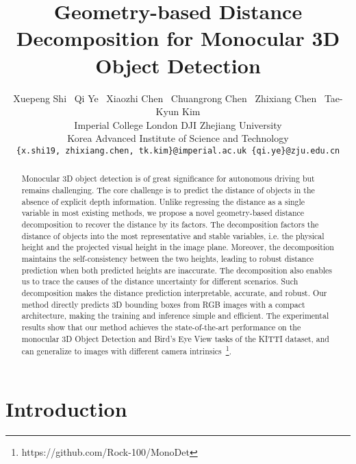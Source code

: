 \documentclass[10pt,twocolumn,letterpaper]{article}
\begin{document}
\title{Geometry-based Distance Decomposition for Monocular 3D Object Detection}

\author{
\parbox{16cm}{
\centering
{\large Xuepeng Shi \ Qi Ye \ Xiaozhi Chen \ Chuangrong Chen \ Zhixiang Chen \ Tae-Kyun Kim}\\
{\normalsize
 Imperial College London \quad  DJI \quad  Zhejiang University\\
 Korea Advanced Institute of Science and Technology\\
}
{\tt\small \{x.shi19, zhixiang.chen, tk.kim\}@imperial.ac.uk \quad \{qi.ye\}@zju.edu.cn}
}
}

\maketitle
\ificcvfinal\thispagestyle{empty}\fi


\begin{abstract}
Monocular 3D object detection is of great significance for autonomous driving but remains challenging. The core challenge is to predict the distance of objects in the absence of explicit depth information. Unlike regressing the distance as a single variable in most existing methods, we propose a novel geometry-based distance decomposition to recover the distance by its factors. The decomposition factors the distance of objects into the most representative and stable variables, i.e. the physical height and the projected visual height in the image plane. Moreover, the decomposition maintains the self-consistency between the two heights, leading to robust distance prediction when both predicted heights are inaccurate. The decomposition also enables us to trace the causes of the distance uncertainty for different scenarios. Such decomposition makes the distance prediction interpretable, accurate, and robust. Our method directly predicts 3D bounding boxes from RGB images with a compact architecture, making the training and inference simple and efficient. The experimental results show that our method achieves the state-of-the-art performance on the monocular 3D Object Detection and Bird’s Eye View tasks of the KITTI dataset, and can generalize to images with different camera intrinsics~\footnote{https://github.com/Rock-100/MonoDet}.
\end{abstract}

\section{Introduction}
\end{document}
